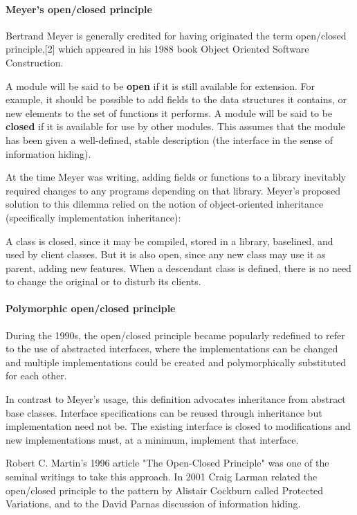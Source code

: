 \documentclass{book}
\begin{document}
\paragraph{Meyer's open/closed principle}

Bertrand Meyer is generally credited for having originated the term open/closed principle,[2] which appeared in his 1988 book Object Oriented Software Construction.

        A module will be said to be \textbf{open} if it is still available for extension. For example, it should be possible to add fields to the data structures it contains,
        or new elements to the set of functions it performs.
        A module will be said to be \textbf{closed} if it is available for use by other modules. This assumes that the module has been given a well-defined,
        stable description (the interface in the sense of information hiding).

At the time Meyer was writing, adding fields or functions to a library inevitably required changes to any programs depending on that library.
Meyer's proposed solution to this dilemma relied on the notion of object-oriented inheritance (specifically implementation inheritance):

    A class is closed, since it may be compiled, stored in a library, baselined, and used by client classes.
    But it is also open, since any new class may use it as parent, adding new features.
    When a descendant class is defined, there is no need to change the original or to disturb its clients.

\paragraph{Polymorphic open/closed principle}

During the 1990s, the open/closed principle became popularly redefined to refer to the use of abstracted interfaces,
where the implementations can be changed and multiple implementations could be created and polymorphically substituted for each other.

In contrast to Meyer's usage, this definition advocates inheritance from abstract base classes. Interface specifications can be reused through inheritance but implementation need not be.
The existing interface is closed to modifications and new implementations must, at a minimum, implement that interface.

Robert C. Martin's 1996 article "The Open-Closed Principle" was one of the seminal writings to take this approach.
In 2001 Craig Larman related the open/closed principle to the pattern by Alistair Cockburn called Protected Variations, and to the David Parnas discussion of information hiding.
\end{document}
